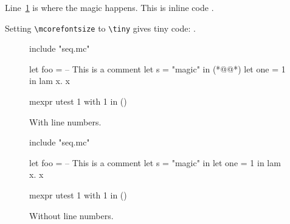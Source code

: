\documentclass{article}
\begin{document}
Line~\ref{l:magic} is where the magic happens. This is inline code
.

\def \mcorefontsize {\tiny}
%
Setting \verb|\mcorefontsize| to \verb|\tiny| gives tiny code: .
%
\def \mcorefontsize {\normalsize}

\begin{figure}[h]
  \begin{mcore-lines}
  include "seq.mc"

  let foo =
    -- This is a comment
    let s = "magic" in (*@\label{l:magic}@*)
    let one = 1 in
    lam x. x

  mexpr
    utest 1 with 1 in ()
  \end{mcore-lines}
  \caption{With line numbers.}
\end{figure}

\begin{figure}[h]
  \begin{mcore}
  include "seq.mc"

  let foo =
    -- This is a comment
    let s = "magic" in
    let one = 1 in
    lam x. x

  mexpr
    utest 1 with 1 in ()
  \end{mcore}
  \caption{Without line numbers.}
\end{figure}


\end{document}
